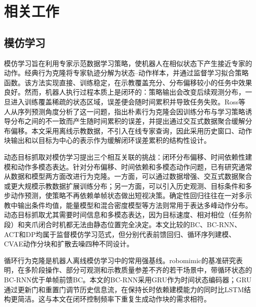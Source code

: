\chapter{相关工作}\label{chap:related-work}

\section{模仿学习}

模仿学习旨在利用专家示范数据学习策略，使机器人在相似状态下产生接近专家的动作。经典行为克隆将专家轨迹分解为状态--动作样本，并通过监督学习拟合策略函数\citep{pomerleau1989alvinn,argall2009survey}。该方法实现直接、训练稳定，在示教覆盖充分、分布偏移较小的任务中效果良好。然而，机器人执行过程本质上是闭环的：策略输出会改变后续观测分布，一旦进入训练覆盖稀疏的状态区域，误差便会随时间累积并导致任务失败。Ross等人从序列预测角度分析了这一问题，指出朴素行为克隆会因训练分布与学习策略诱导分布之间的不一致而产生随时间累积的误差，并提出通过交互式数据聚合缓解分布偏移\citep{ross2010efficient,ross2011reduction}。本文采用离线示教数据，不引入在线专家查询，因此采用历史窗口、动作块输出和以目标为中心的表示作为缓解闭环误差累积的结构性设计\citep{mandlekar2021matters,zhao2023learning,chi2024universal}。

动态目标抓取对模仿学习提出三个相互关联的挑战：闭环分布偏移、时间依赖性建模和动作多模态表达。针对分布偏移、时间依赖和多模态动作问题，已有研究通常从数据和模型两方面改进行为克隆。一方面，可以通过数据增强、交互式数据聚合或更大规模示教数据扩展训练分布\citep{ross2010efficient,ross2011reduction,mandlekar2021matters}；另一方面，可以引入历史观测、目标条件和多步动作预测，使策略不再依赖单帧状态做出短视决策\citep{mandlekar2021matters,zhao2023learning,chi2023diffusion}。确定性回归往往在一对多示教中输出条件均值，能量模型和混合密度模型等方法则常用于表达多峰动作分布\citep{bishop1994mixture,florence2022implicit}。动态目标抓取尤其需要时间信息和多模态表达，因为目标速度、相对相位（任务阶段）和夹爪闭合时机都无法由静态位置完全决定。本文比较的BC、BC-RNN、ACT和DP均属于监督模仿学习范式，但分别代表前馈回归、循环序列建模、CVAE动作分块和扩散去噪四种不同设计。

循环行为克隆是机器人离线模仿学习中的常用强基线。robomimic的基准研究表明，在多阶段操作、部分可观测和示教质量参差不齐的若干场景中，带循环状态的BC-RNN优于单帧前馈BC\citep{mandlekar2021matters}。本文的BC-RNN采用GRU作为时间状态编码器；GRU通过更新门和重置门调节历史信息流，在保持长时依赖建模能力的同时比LSTM结构更简洁\citep{cho2014learning,chung2014empirical}。这与本文在闭环控制频率下重复生成动作块的需求相符。

